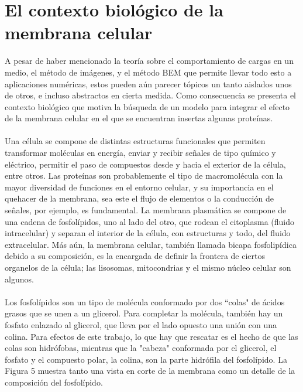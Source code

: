 \documentclass[12pt, oneside, numbers, spanish]{ezthesis}
\numberwithin{equation}{section}
\begin{document}
\section{El contexto biológico de la membrana celular}\label{Sec:Cell_Bio}
A pesar de haber mencionado la teoría sobre el comportamiento de cargas en un medio, el método de imágenes, y el método BEM que permite llevar todo esto a aplicaciones numéricas, estos pueden aún parecer tópicos un tanto aislados unos de otros, e incluso abstractos en cierta medida. Como consecuencia se presenta el contexto biológico que motiva la búsqueda de un modelo para integrar el efecto de la membrana celular en el que se encuentran insertas algunas proteínas.\\\\
Una célula se compone de distintas estructuras funcionales que permiten transformar moléculas en energía, enviar y recibir señales de tipo químico y eléctrico, permitir el paso de compuestos desde y hacia el exterior de la célula, entre otros. Las proteínas son probablemente el tipo de macromolécula con la mayor diversidad de funciones en el entorno celular, y su importancia en el quehacer de la membrana, sea este el flujo de elementos o la conducción de señales, por ejemplo, es fundamental. La membrana plasmática se compone de una cadena de fosfolípidos, uno al lado del otro, que rodean el citoplasma (fluido intracelular) y separan el interior de la célula, con estructuras y todo, del fluido extracelular. Más aún, la membrana celular, también llamada bicapa fosfolipídica debido a su composición, es la encargada de definir la frontera de ciertos organelos de la célula; las lisosomas, mitocondrias y el mismo núcleo celular son algunos.\\\\
Los fosfolípidos son un tipo de molécula conformado por dos ``colas" de ácidos grasos que se unen a un glicerol. Para completar la molécula, también hay un fosfato enlazado al glicerol, que lleva por el lado opuesto una unión con una colina. Para efectos de este trabajo, lo que hay que rescatar es el hecho de que las colas son hidrófobas, mientras que la "cabeza" conformada por el glicerol, el fosfato y el compuesto polar, la colina, son la parte hidrófila del fosfolípido. La Figura 5 muestra tanto una vista en corte de la membrana como un detalle de la composición del fosfolípido.
%	
\end{document}

